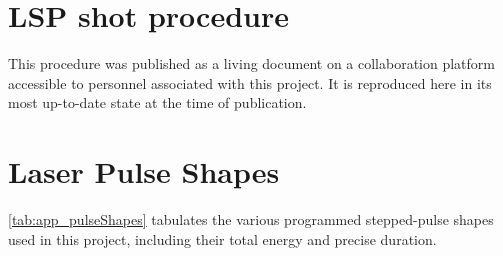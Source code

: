 \documentclass[11pt,a4paper]{report}
\begin{document}
    \chapter{LSP shot procedure} \label{chp:app_procedure}
        This procedure was published as a living document on a collaboration platform accessible to personnel associated with this project. It is reproduced here in its most up-to-date state at the time of publication.

        
    \chapter{Laser Pulse Shapes} \label{chp:app_pulseShapes}
        \autoref{tab:app_pulseShapes} tabulates the various programmed stepped-pulse shapes used in this project, including their total energy and precise duration.
        
\end{document}
